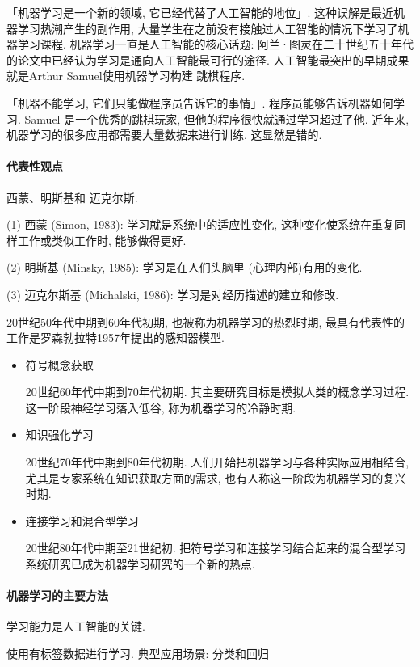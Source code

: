 「机器学习是一个新的领域, 它已经代替了人工智能的地位」. 这种误解是最近机器学习热潮产生的副作用, 大量学生在之前没有接触过人工智能的情况下学习了机器学习课程. 机器学习一直是人工智能的核心话题: 阿兰·图灵在二十世纪五十年代的论文中已经认为学习是通向人工智能最可行的途径. 人工智能最突出的早期成果就是Arthur Samuel使用机器学习构建 跳棋程序.

「机器不能学习, 它们只能做程序员告诉它的事情」. 程序员能够告诉机器如何学习. Samuel 是一个优秀的跳棋玩家, 但他的程序很快就通过学习超过了他. 近年来, 机器学习的很多应用都需要大量数据来进行训练. 这显然是错的.
\paragraph{代表性观点} 西蒙、明斯基和 迈克尔斯.

 (1) 西蒙 (Simon, 1983): 学习就是系统中的适应性变化, 这种变化使系统在重复同样工作或类似工作时, 能够做得更好.

 (2) 明斯基 (Minsky, 1985): 学习是在人们头脑里 (心理内部)有用的变化.

 (3) 迈克尔斯基 (Michalski, 1986): 学习是对经历描述的建立和修改.

20世纪50年代中期到60年代初期, 也被称为机器学习的热烈时期, 最具有代表性的工作是罗森勃拉特1957年提出的感知器模型.
\begin{itemize}
\item 符号概念获取

    20世纪60年代中期到70年代初期. 其主要研究目标是模拟人类的概念学习过程. 这一阶段神经学习落入低谷, 称为机器学习的冷静时期.
\item 知识强化学习

    20世纪70年代中期到80年代初期. 人们开始把机器学习与各种实际应用相结合, 尤其是专家系统在知识获取方面的需求, 也有人称这一阶段为机器学习的复兴时期.
\item 连接学习和混合型学习

    20世纪80年代中期至21世纪初. 把符号学习和连接学习结合起来的混合型学习系统研究已成为机器学习研究的一个新的热点.
\end{itemize}
\paragraph{机器学习的主要方法}
学习能力是人工智能的关键.
\begin{tcolorbox}[colback=white!50,colframe=orange!50,title=监督学习 ( Supervised learning)]
    使用有标签数据进行学习. 典型应用场景: 分类和回归
\end{tcolorbox}

